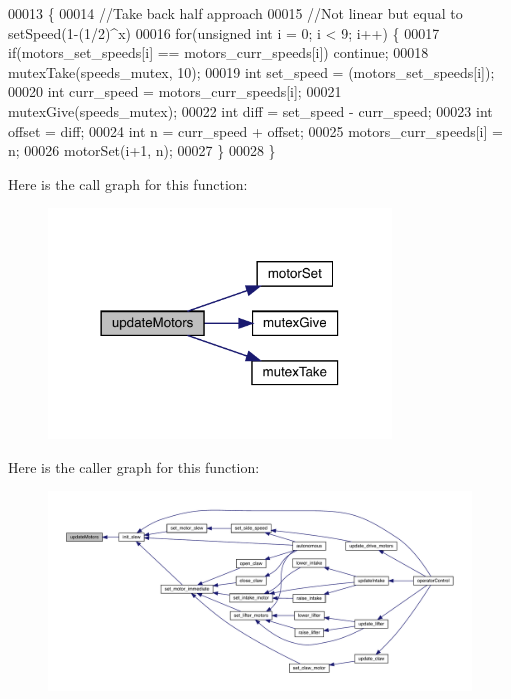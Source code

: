 \begin{DoxyCode}
00013                    \{
00014   \textcolor{comment}{//Take back half approach}
00015   \textcolor{comment}{//Not linear but equal to setSpeed(1-(1/2)^x)}
00016   \textcolor{keywordflow}{for}(\textcolor{keywordtype}{unsigned} \textcolor{keywordtype}{int} i = 0; i < 9; i++) \{
00017     \textcolor{keywordflow}{if}(motors_set_speeds[i] == motors_curr_speeds[i]) \textcolor{keywordflow}{continue};
00018     mutexTake(speeds_mutex, 10);
00019     \textcolor{keywordtype}{int} set\_speed = (motors_set_speeds[i]);
00020     \textcolor{keywordtype}{int} curr\_speed = motors_curr_speeds[i];
00021     mutexGive(speeds_mutex);
00022     \textcolor{keywordtype}{int} diff = set\_speed - curr\_speed;
00023     \textcolor{keywordtype}{int} offset = diff;
00024     \textcolor{keywordtype}{int} n = curr\_speed + offset;
00025     motors_curr_speeds[i] = n;
00026     motorSet(i+1, n);
00027   \}
00028 \}
\end{DoxyCode}
Here is the call graph for this function\+:\nopagebreak
\begin{figure}[H]
\begin{center}
\leavevmode
\includegraphics[width=258pt]{slew_8h_a807a87c5df438fde21c1e8213906695b_cgraph}
\end{center}
\end{figure}
Here is the caller graph for this function\+:\nopagebreak
\begin{figure}[H]
\begin{center}
\leavevmode
\includegraphics[width=350pt]{slew_8h_a807a87c5df438fde21c1e8213906695b_icgraph}
\end{center}
\end{figure}
